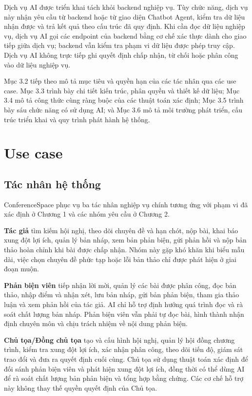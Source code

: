 Dịch vụ AI được triển khai tách khỏi backend nghiệp vụ. Tùy chức năng, dịch vụ này nhận yêu cầu từ backend hoặc từ giao diện Chatbot Agent, kiểm tra dữ liệu nhận được và trả kết quả theo cấu trúc đã quy định. Khi cần đọc dữ liệu nghiệp vụ, dịch vụ AI gọi các endpoint của backend bằng cơ chế xác thực dành cho giao tiếp giữa dịch vụ; backend vẫn kiểm tra phạm vi dữ liệu được phép truy cập. Dịch vụ AI không trực tiếp ghi quyết định chấp nhận, từ chối hoặc phân công vào dữ liệu nghiệp vụ.

Mục 3.2 tiếp theo mô tả mục tiêu và quyền hạn của các tác nhân qua các use case. Mục 3.3 trình bày chi tiết kiến trúc, phân quyền và thiết kế dữ liệu; Mục 3.4 mô tả công thức cùng ràng buộc của các thuật toán xác định; Mục 3.5 trình bày sáu chức năng có sử dụng AI; và Mục 3.6 mô tả môi trường phát triển, cấu trúc triển khai và quy trình phát hành hệ thống.

\ifdefined\ChapterThreeOverviewOnly
\else

\section{Use case}

\subsection{Tác nhân hệ thống}

ConferenceSpace phục vụ ba tác nhân nghiệp vụ chính tương ứng với phạm vi đã xác định ở Chương 1 và các nhóm yêu cầu ở Chương 2.

\textbf{Tác giả} tìm kiếm hội nghị, theo dõi chuyên đề và hạn chót, nộp bài, khai báo xung đột lợi ích, quản lý bản nháp, xem bản phản biện, gửi phản hồi và nộp bản thảo hoàn chỉnh khi bài được chấp nhận. Nhóm này gặp khó khăn khi biểu mẫu dài, việc chọn chuyên đề phức tạp hoặc lỗi bản thảo chỉ được phát hiện ở giai đoạn muộn.

\textbf{Phản biện viên} tiếp nhận lời mời, quản lý các bài được phân công, đọc bản thảo, nhập điểm và nhận xét, lưu bản nháp, gửi bản phản biện, tham gia thảo luận và xem phản hồi của tác giả. AI chỉ hỗ trợ định hướng quá trình đọc và rà soát chất lượng bản nháp. Phản biện viên vẫn phải tự đọc bài, hình thành nhận định chuyên môn và chịu trách nhiệm về nội dung phản biện.

\textbf{Chủ tọa/Đồng chủ tọa} tạo và cấu hình hội nghị, quản lý hội đồng chương trình, kiểm tra xung đột lợi ích, xác nhận phân công, theo dõi tiến độ, giám sát trao đổi và đưa ra quyết định cuối cùng. Chủ tọa sử dụng thuật toán xác định để đối sánh phản biện viên và phát hiện xung đột lợi ích, đồng thời có thể dùng AI để rà soát chất lượng bản phản biện và tổng hợp bằng chứng. Các cơ chế hỗ trợ này không thay thế quyền quyết định của Chủ tọa.

